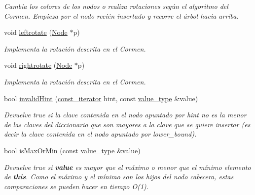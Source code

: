 \begin{Indent}
\begin{DoxyCompactItemize}
\begin{DoxyCompactList}\small\item\em Cambia los colores de los nodos o realiza rotaciones según el algoritmo del Cormen. Empieza por el nodo recién insertado y recorre el árbol hacia arriba. \end{DoxyCompactList}\item 
void \hyperlink{classaed2_1_1map_ad764851f1534f2db0964c4f729056a1e_ad764851f1534f2db0964c4f729056a1e}{leftrotate} (\hyperlink{structaed2_1_1map_1_1Node}{Node} $\ast$p)
\begin{DoxyCompactList}\small\item\em Implementa la rotación descrita en el Cormen. \end{DoxyCompactList}\item 
void \hyperlink{classaed2_1_1map_a816d69fa4dfe18a984dc3628fee14e2f_a816d69fa4dfe18a984dc3628fee14e2f}{rightrotate} (\hyperlink{structaed2_1_1map_1_1Node}{Node} $\ast$p)
\begin{DoxyCompactList}\small\item\em Implementa la rotación descrita en el Cormen. \end{DoxyCompactList}\item 
bool \hyperlink{classaed2_1_1map_a7403745a296985d64b8666c18953b2c0_a7403745a296985d64b8666c18953b2c0}{invalid\+Hint} (\hyperlink{classaed2_1_1map_1_1const__iterator}{const\+\_\+iterator} hint, const \hyperlink{classaed2_1_1map_a719db98e0ff9a837610f76be33264680_a719db98e0ff9a837610f76be33264680}{value\+\_\+type} \&value)
\begin{DoxyCompactList}\small\item\em Devuelve true si la clave contenida en el nodo apuntado por hint {\itshape  no es } la menor de las claves del diccionario que son mayores a la clave que se quiere insertar (es decir la clave contenida en el nodo apuntado por lower\+\_\+bound). \end{DoxyCompactList}\item 
bool \hyperlink{classaed2_1_1map_a81db4ead6daafe94938d5410173bdb6c_a81db4ead6daafe94938d5410173bdb6c}{is\+Max\+Or\+Min} (const \hyperlink{classaed2_1_1map_a719db98e0ff9a837610f76be33264680_a719db98e0ff9a837610f76be33264680}{value\+\_\+type} \&value)
\begin{DoxyCompactList}\small\item\em Devuelve true si {\bfseries value} es mayor que el máximo o menor que el mínimo elemento de {\bfseries this}. Como el máximo y el mínimo son los hijos del nodo cabecera, estas comparaciones se pueden hacer en tiempo O(1). \end{DoxyCompactList}\item 

\end{DoxyCompactItemize}
\end{Indent}
